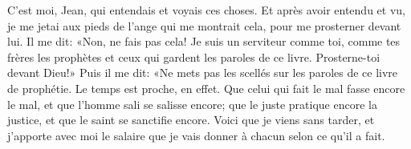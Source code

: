 C’est moi, Jean, qui entendais et voyais ces choses.
Et après avoir entendu et vu,
	je me jetai aux pieds de l’ange qui me montrait cela,
	pour me prosterner devant lui.
Il me dit: «Non, ne fais pas cela!
	Je suis un serviteur comme toi,
	comme tes frères les prophètes et ceux qui gardent les paroles de ce livre.
	Prosterne-toi devant Dieu!»
Puis il me dit:
	«Ne mets pas les scellés sur les paroles de ce livre de prophétie.
	Le temps est proche, en effet.
Que celui qui fait le mal fasse encore le mal,
	et que l’homme sali se salisse encore;
	que le juste pratique encore la justice,
	et que le saint se sanctifie encore.
Voici que je viens sans tarder,
	et j’apporte avec moi le salaire
	que je vais donner à chacun selon ce qu’il a fait.
